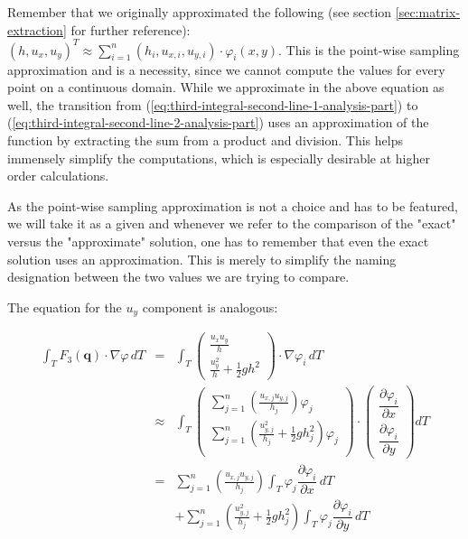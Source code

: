 \documentclass{article}
\newcommand{\pd}[2]{\dfrac{\partial #1}{\partial #2}}
\renewcommand{\phi}{\varphi}
\begin{document}
Remember that we originally approximated the following (see section \ref{sec:matrix-extraction} for further reference):  $(h, u_x, u_y)^T \approx \sum_{i=1}^n (h_i, u_{x,i}, u_{y,i}) \cdot \phi_i(x,y)$. This is the point-wise sampling approximation and is a necessity, since we cannot compute the values for every point on a continuous domain. While we approximate in the above equation as well, the transition from (\ref{eq:third-integral-second-line-1-analysis-part}) to (\ref{eq:third-integral-second-line-2-analysis-part}) uses an approximation of the function by extracting the sum from a product and division. This helps immensely simplify the computations, which is especially desirable at higher order calculations.

As the point-wise sampling approximation is not a choice and has to be featured, we will take it as a given and whenever we refer to the comparison of the "exact" versus the "approximate" solution, one has to remember that even the exact solution uses an approximation. This is merely to simplify the naming designation between the two values we are trying to compare.

The equation for the $u_y$ component is analogous:

\begin{eqnarray*}
  \int_T F_3\left(\mathbf{q}\right) \cdot \nabla \phi \, dT & = &
  \int_T
  \begin{pmatrix}
    \frac{u_x u_y}{h} \\ \frac{u_y^2}{h} + \frac{1}{2} g h^2
  \end{pmatrix}
  \cdot \nabla \phi_i \, dT \\
  & \approx & \int_T
  \begin{pmatrix}
    \sum_{j=1}^n \left(\frac{u_{x,j} u_{y,j}}{h_j}\right) \phi_j \\
    \sum_{j=1}^n \left(\frac{u_{y,j}^2}{h_j} + \frac{1}{2} g h_j^2\right) \phi_j \\
  \end{pmatrix}
  \cdot
  \begin{pmatrix}
    \pd{\phi_i}{x} \\
    \pd{\phi_i}{y}
  \end{pmatrix} dT \\
  & = & \sum_{j=1}^n \left(\frac{u_{x,j} u_{y,j}}{h_j}\right) \int_T \phi_j \pd{\phi_i}{x} \, dT \\
  & {} & + \sum_{j=1}^n \left(\frac{u_{y,j}^2}{h_j} + \frac{1}{2} g h_j^2\right) \int_T \phi_j \pd{\phi_i}{y} \, dT
\end{eqnarray*}
\end{document}
